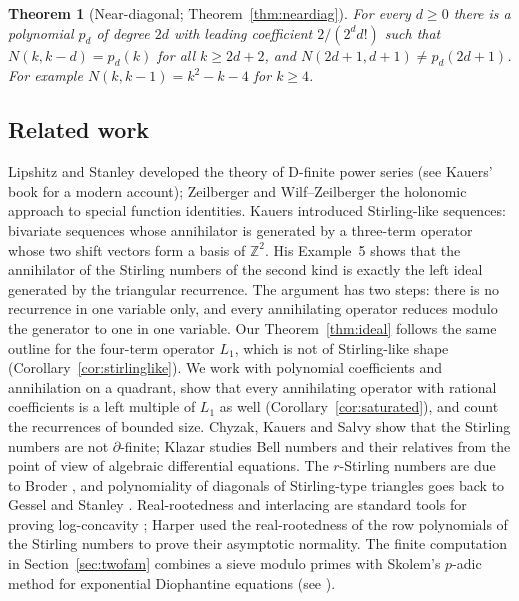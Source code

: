 \documentclass[11pt]{amsart}
\newtheorem{introthm}{Theorem}
\theoremstyle{definition}
\newcommand{\Z}{\mathbb{Z}}
\begin{document}
\begin{introthm}[Near-diagonal; Theorem~\ref{thm:neardiag}]\label{intro:neardiag}
For every $d\ge0$ there is a polynomial $p_d$ of degree $2d$ with leading coefficient $2/(2^d d!)$ such that $N(k,k-d)=p_d(k)$ for all $k\ge2d+2$, and $N(2d+1,d+1)\ne p_d(2d+1)$. For example $N(k,k-1)=k^2-k-4$ for $k\ge4$.
\end{introthm}

\subsection{Related work}
Lipshitz \cite{Lipshitz} and Stanley \cite{Stanley80} developed the theory of D-finite power series (see Kauers' book \cite{Kauers23} for a modern account); Zeilberger \cite{Zeilberger90} and Wilf--Zeilberger \cite{WZ92} the holonomic approach to special function identities. Kauers \cite{Kauers07} introduced Stirling-like sequences: bivariate sequences whose annihilator is generated by a three-term operator whose two shift vectors form a basis of $\Z^2$. His Example~5 shows that the annihilator of the Stirling numbers of the second kind is exactly the left ideal generated by the triangular recurrence. The argument has two steps: there is no recurrence in one variable only, and every annihilating operator reduces modulo the generator to one in one variable. Our Theorem~\ref{thm:ideal} follows the same outline for the four-term operator $L_1$, which is not of Stirling-like shape (Corollary~\ref{cor:stirlinglike}). We work with polynomial coefficients and annihilation on a quadrant, show that every annihilating operator with rational coefficients is a left multiple of $L_1$ as well (Corollary~\ref{cor:saturated}), and count the recurrences of bounded size. Chyzak, Kauers and Salvy \cite{CKS09} show that the Stirling numbers are not $\partial$-finite; Klazar \cite{Klazar} studies Bell numbers and their relatives from the point of view of algebraic differential equations. The $r$-Stirling numbers are due to Broder \cite{Broder}, and polynomiality of diagonals of Stirling-type triangles goes back to Gessel and Stanley \cite{GesselStanley}. Real-rootedness and interlacing are standard tools for proving log-concavity \cite{Stanley89,Branden,Fisk}; Harper \cite{Harper} used the real-rootedness of the row polynomials of the Stirling numbers to prove their asymptotic normality. The finite computation in Section~\ref{sec:twofam} combines a sieve modulo primes with Skolem's $p$-adic method for exponential Diophantine equations (see \cite{Smart}).
\end{document}
